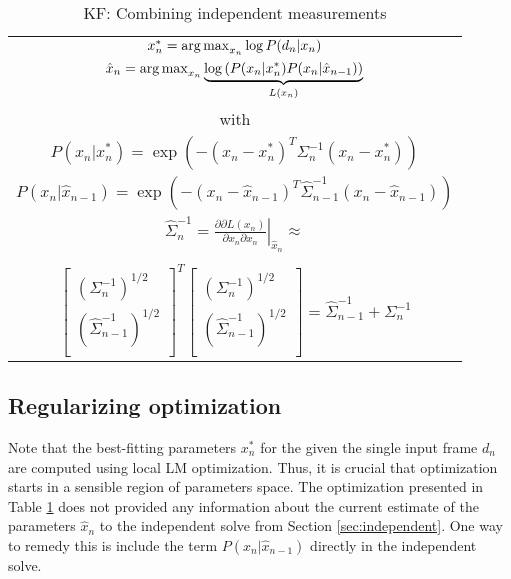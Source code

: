 \begin{table}[ht] 
\centering
\caption{KF: Combining independent measurements\label{tab:kf-like}} 
\begin{tabular}{|c|}
\hline
$x_n^* = \operatorname*{arg\,max}_{x_n} \log P(d_n|x_n)$ \\
$\hat{x}_n = \operatorname*{arg\,max}_{x_n} \underbrace{\log \left( P(x_n|x_n^*) P(x_n |\hat{x}_{n - 1}) \right)}_{L(x_n)}$\\
with \\
$P(x_n |x_n^*) = \exp \left( - (x_n - x_n^* )^T \Sigma_n^{-1}(x_n - x_n^* )\right)$ \\
$P(x_n |\hat{x}_{n - 1}) = \exp \left( - (x_n - \hat{x}_{n - 1} )^T \hat{\Sigma}_{n - 1}^{-1} (x_n - \hat{x}_{n - 1} )\right)$ \\	

$\hat{\Sigma}_n^{-1} = \left. \tfrac{\partial \partial L(x_n)}{\partial x_n \partial x_n}\right|_{\hat{x}_n} \approx $ \\
\\
$\left[
	\begin{array}{cc}
		\left(\Sigma_n^{-1}\right)^{1/2} \\
		\left(\hat{\Sigma}_{n - 1}^{-1}\right)^{1/2} \\
	\end{array}
\right]^T 
\left[
	\begin{array}{c}
		\left(\Sigma_n^{-1}\right)^{1/2} \\
		\left(\hat{\Sigma}_{n - 1}^{-1}\right)^{1/2} \\
	\end{array}
\right] = \hat{\Sigma}_{n-1}^{-1}  + \Sigma_{n}^{-1}$ \\

\hline
\end{tabular}
\end{table}

\subsection{Regularizing optimization}

Note that the best-fitting parameters $x_n^*$ for the given the single input frame $d_n$ are computed using local LM optimization. Thus, it is crucial that optimization starts in a sensible region of parameters space. The optimization presented in Table \ref{tab:kf-like} does not provided any information about the current estimate of the parameters $\hat{x}_n$ to the independent solve from Section \ref{sec:independent}. One way to remedy this is include the term $P(x_n |\hat{x}_{n - 1})$ directly in the independent solve.

